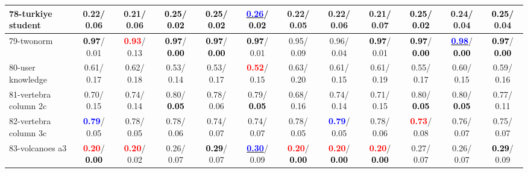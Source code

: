 \begin{table}[h]
\begin{center}
{\begin{tabular}{lc|c|c|c|c|c|c|c|c|c|c}
78-turkiye student &   0.22/  0.06 &   0.21/  0.06 & \textcolor{black}{\textbf{  0.25}}/\textcolor{black}{\textbf{  0.02}} & \textcolor{black}{\textbf{  0.25}}/\textcolor{black}{\textbf{  0.02}} & \underline{\textcolor{blue}{\textbf{  0.26}}}/\textcolor{black}{\textbf{  0.02}} &   0.22/  0.05 &   0.22/  0.06 &   0.21/  0.07 & \textcolor{black}{\textbf{  0.25}}/\textcolor{black}{\textbf{  0.02}} &   0.24/  0.04 & \textcolor{black}{\textbf{  0.25}}/  0.04 \\ \hline
79-twonorm & \textcolor{black}{\textbf{  0.97}}/  0.01 & \textcolor{red}{\textbf{  0.93}}/  0.13 & \textcolor{black}{\textbf{  0.97}}/\textcolor{black}{\textbf{  0.00}} & \textcolor{black}{\textbf{  0.97}}/\textcolor{black}{\textbf{  0.00}} & \textcolor{black}{\textbf{  0.97}}/  0.01 &   0.95/  0.09 &   0.96/  0.04 & \textcolor{black}{\textbf{  0.97}}/  0.01 & \textcolor{black}{\textbf{  0.97}}/\textcolor{black}{\textbf{  0.00}} & \underline{\textcolor{blue}{\textbf{  0.98}}}/\textcolor{black}{\textbf{  0.00}} & \textcolor{black}{\textbf{  0.97}}/\textcolor{black}{\textbf{  0.00}} \\
80-user knowledge &   0.61/  0.17 &   0.62/  0.18 &   0.53/  0.14 &   0.53/  0.17 & \textcolor{red}{\textbf{  0.52}}/  0.15 &   0.63/  0.20 &   0.61/  0.15 &   0.61/  0.19 &   0.55/  0.17 &   0.60/  0.15 &   0.59/  0.16 \\
81-vertebra column 2c &   0.70/  0.15 &   0.74/  0.14 &   0.80/\textcolor{black}{\textbf{  0.05}} &   0.78/  0.06 &   0.79/\textcolor{black}{\textbf{  0.05}} &   0.68/  0.16 &   0.74/  0.14 &   0.71/  0.15 &   0.80/\textcolor{black}{\textbf{  0.05}} &   0.80/\textcolor{black}{\textbf{  0.05}} &   0.77/  0.11 \\
82-vertebra column 3c & \textcolor{blue}{\textbf{  0.79}}/  0.05 &   0.78/  0.05 &   0.78/  0.06 &   0.74/  0.07 &   0.74/  0.07 &   0.78/  0.05 & \textcolor{blue}{\textbf{  0.79}}/  0.05 &   0.78/  0.06 & \textcolor{red}{\textbf{  0.73}}/  0.08 &   0.76/  0.07 &   0.75/  0.07 \\
83-volcanoes a3 & \textcolor{red}{\textbf{  0.20}}/\textcolor{black}{\textbf{  0.00}} & \textcolor{red}{\textbf{  0.20}}/  0.02 &   0.26/  0.07 & \textcolor{black}{\textbf{  0.29}}/  0.07 & \underline{\textcolor{blue}{\textbf{  0.30}}}/  0.09 & \textcolor{red}{\textbf{  0.20}}/\textcolor{black}{\textbf{  0.00}} & \textcolor{red}{\textbf{  0.20}}/\textcolor{black}{\textbf{  0.00}} & \textcolor{red}{\textbf{  0.20}}/\textcolor{black}{\textbf{  0.00}} &   0.27/  0.07 &   0.26/  0.07 & \textcolor{black}{\textbf{  0.29}}/  0.09 \\

\end{tabular}}
\end{center}
\end{table}
